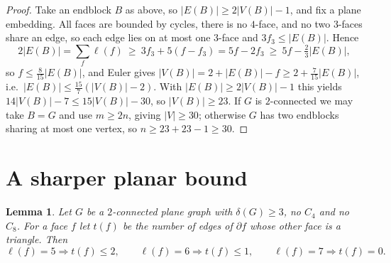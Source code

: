 \documentclass[11pt]{article}
\theoremstyle{plain}
\newtheorem{lemma}[theorem]{Lemma}
\theoremstyle{definition}
\newcommand{\Cfour}{C_4}
\newcommand{\Ceight}{C_8}
\begin{document}
\begin{proof}
Take an endblock $B$ as above, so $|E(B)|\ge2|V(B)|-1$, and fix a plane
embedding. All faces are bounded by cycles, there is no $4$-face, and no two
$3$-faces share an edge, so each edge lies on at most one $3$-face and
$3f_3\le|E(B)|$. Hence
\[
  2|E(B)|=\sum_f\ell(f)\ \ge\ 3f_3+5(f-f_3)=5f-2f_3\ \ge\ 5f-\tfrac23|E(B)|,
\]
so $f\le\tfrac{8}{15}|E(B)|$, and Euler gives
$|V(B)|=2+|E(B)|-f\ge2+\tfrac{7}{15}|E(B)|$, i.e.\
$|E(B)|\le\tfrac{15}{7}(|V(B)|-2)$. With $|E(B)|\ge2|V(B)|-1$ this yields
$14|V(B)|-7\le15|V(B)|-30$, so $|V(B)|\ge23$. If $G$ is $2$-connected we may take
$B=G$ and use $m\ge2n$, giving $|V|\ge30$; otherwise $G$ has two endblocks
sharing at most one vertex, so $n\ge23+23-1\ge30$.
\end{proof}

\section{A sharper planar bound}

\begin{lemma}\label{lem:facelemma}
Let $G$ be a $2$-connected plane graph with $\delta(G)\ge3$, no $\Cfour$ and no
$\Ceight$. For a face $f$ let $t(f)$ be the number of edges of $\partial f$ whose
other face is a triangle. Then
\[
  \ell(f)=5\Rightarrow t(f)\le2,\qquad
  \ell(f)=6\Rightarrow t(f)\le1,\qquad
  \ell(f)=7\Rightarrow t(f)=0.
\]
\end{lemma}
\end{document}
